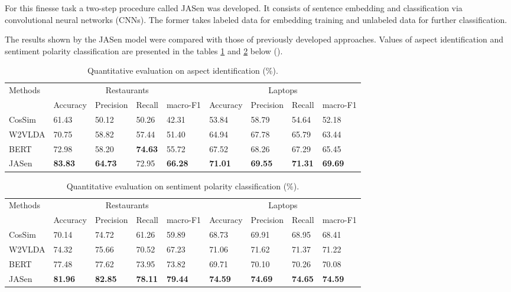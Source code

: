 \documentclass[13pt, a4paper]{article}
\newcommand{\toprule}{\hline}
\newcommand{\botrule}{\hline}
\newcommand{\colrule}{\hline}
\begin{document}
For this finesse task a two-step procedure called JASen was developed. It consists of sentence embedding and classification via convolutional neural networks (CNNs). The former takes labeled data for embedding training and unlabeled data for further classification.

The results shown by the JASen model were compared with those of previously developed approaches. Values of aspect identification and sentiment polarity classification are presented in the tables \ref{tab:t1} and \ref{tab:t2} below (\cite{huang2020weakly}).

\begin{table}[h]
\caption{Quantitative evaluation on aspect identification (\%).}
\label{tab:t1}
\begin{tabular*}{\hsize}{@{\extracolsep{\fill}}lllllllll@{}}
\toprule
\multirow{2}{*}{Methods} & \multicolumn{4}{c}{Restaurants}          & \multicolumn{4}{c}{Laptops}              \\ 
                         & Accuracy & Precision & Recall & macro-F1 & Accuracy & Precision & Recall & macro-F1 \\
\colrule
CosSim & 61.43 & 50.12 & 50.26 & 42.31 & 53.84 & 58.79 & 54.64 & 52.18 \\
W2VLDA & 70.75 & 58.82 & 57.44 & 51.40 & 64.94 & 67.78 & 65.79 & 63.44 \\
BERT & 72.98 & 58.20 & \textbf{74.63} & 55.72 & 67.52 & 68.26 & 67.29 & 65.45 \\
JASen & \textbf{83.83} & \textbf{64.73} & 72.95 & \textbf{66.28} & \textbf{71.01} & \textbf{69.55} & \textbf{71.31} & \textbf{69.69} \\
\botrule
\end{tabular*}
\end{table}

\begin{table}[h]
\caption{Quantitative evaluation on sentiment polarity classification (\%).}
\label{tab:t2}
\begin{tabular*}{\hsize}{@{\extracolsep{\fill}}lllllllll@{}}
\toprule
\multirow{2}{*}{Methods} & \multicolumn{4}{c}{Restaurants}          & \multicolumn{4}{c}{Laptops}              \\ 
                         & Accuracy & Precision & Recall & macro-F1 & Accuracy & Precision & Recall & macro-F1 \\
\colrule
CosSim & 70.14 & 74.72 & 61.26 & 59.89 & 68.73 & 69.91 & 68.95 & 68.41 \\
W2VLDA & 74.32 & 75.66 & 70.52 & 67.23 & 71.06 & 71.62 & 71.37 & 71.22 \\
BERT & 77.48 & 77.62 & 73.95 & 73.82 & 69.71 & 70.10 & 70.26 & 70.08 \\
JASen & \textbf{81.96} & \textbf{82.85} & \textbf{78.11} & \textbf{79.44} & \textbf{74.59} & \textbf{74.69} & \textbf{74.65} & \textbf{74.59} \\
\botrule
\end{tabular*}
\end{table}
\end{document}
